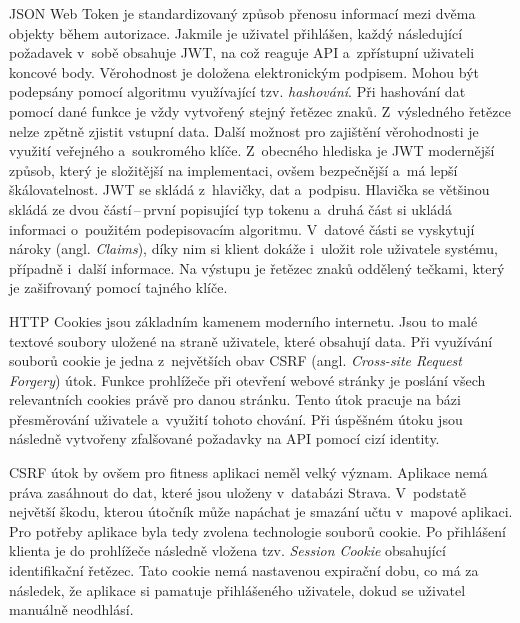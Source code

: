 JSON Web Token je standardizovaný způsob přenosu informací mezi dvěma objekty během autorizace. Jakmile je uživatel přihlášen, každý následující požadavek v~sobě obsahuje JWT, na což reaguje API a~zpřístupní uživateli koncové body. Věrohodnost je doložena elektronickým podpisem. Mohou být podepsány pomocí algoritmu využívající tzv. \emph{hashování}. Při hashování dat pomocí dané funkce je vždy vytvořený stejný řetězec znaků. Z~výsledného řetězce nelze zpětně zjistit vstupní data. Další možnost pro zajištění věrohodnosti je využití veřejného a~soukromého klíče. Z~obecného hlediska je JWT modernější způsob, který je složitější na implementaci, ovšem bezpečnější a~má lepší škálovatelnost. JWT se skládá z~hlavičky, dat a~podpisu. Hlavička se většinou skládá ze dvou částí\,--\,první popisující typ tokenu a~druhá část si ukládá informaci o~použitém podepisovacím algoritmu. V~datové části se vyskytují nároky (angl. \emph{Claims}), díky nim si klient dokáže i~uložit role uživatele systému, případně i~další informace. Na výstupu je řetězec znaků oddělený tečkami, který je zašifrovaný pomocí tajného klíče. \cite{CookieVsJWT, JWT}

HTTP Cookies jsou základním kamenem moderního internetu. Jsou to malé textové soubory uložené na straně uživatele, které obsahují data. Při využívání souborů cookie je jedna z~největších obav CSRF (angl. \emph{Cross-site Request Forgery}) útok. Funkce prohlížeče při otevření webové stránky je poslání všech relevantních cookies právě pro danou stránku. Tento útok pracuje na bázi přesměrování uživatele a~využití tohoto chování. Při úspěšném útoku jsou následně vytvořeny zfalšované požadavky na API pomocí cizí identity. \cite{Cookies, CSRF}

CSRF útok by ovšem pro fitness aplikaci neměl velký význam. Aplikace nemá práva zasáhnout do dat, které jsou uloženy v~databázi Strava. V~podstatě největší škodu, kterou útočník může napáchat je smazání učtu v~mapové aplikaci. Pro potřeby aplikace byla tedy zvolena technologie souborů cookie. Po přihlášení klienta je do prohlížeče následně vložena tzv. \emph{Session Cookie} obsahující identifikační řetězec. Tato cookie nemá nastavenou expirační dobu, co má za následek, že aplikace si pamatuje přihlášeného uživatele, dokud se uživatel manuálně neodhlásí. 

